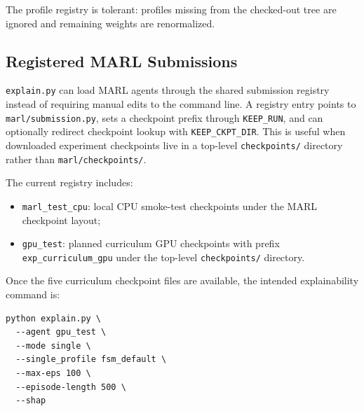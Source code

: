 The profile registry is tolerant: profiles missing from the checked-out tree are ignored and remaining weights are renormalized.

\subsection{Registered MARL Submissions}

\texttt{explain.py} can load MARL agents through the shared submission registry instead of requiring manual edits to the command line. A registry entry points to \texttt{marl/submission.py}, sets a checkpoint prefix through \texttt{KEEP\_RUN}, and can optionally redirect checkpoint lookup with \texttt{KEEP\_CKPT\_DIR}. This is useful when downloaded experiment checkpoints live in a top-level \texttt{checkpoints/} directory rather than \texttt{marl/checkpoints/}.

The current registry includes:

\begin{itemize}
  \item \texttt{marl\_test\_cpu}: local CPU smoke-test checkpoints under the MARL checkpoint layout;
  \item \texttt{gpu\_test}: planned curriculum GPU checkpoints with prefix \texttt{exp\_curriculum\_gpu} under the top-level \texttt{checkpoints/} directory.
\end{itemize}

Once the five curriculum checkpoint files are available, the intended explainability command is:

\begin{lstlisting}
python explain.py \
  --agent gpu_test \
  --mode single \
  --single_profile fsm_default \
  --max-eps 100 \
  --episode-length 500 \
  --shap
\end{lstlisting}
